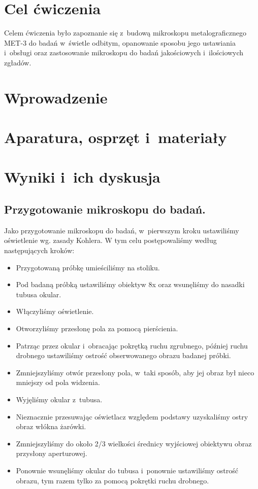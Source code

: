 

\newcommand{\labdate}{28 listopada 2020}
\newcommand{\temat}{Mikroskop MET-3}


    



\section{Cel ćwiczenia}

Celem ćwiczenia było zapoznanie się z~budową mikroskopu metalograficznego MET-3 do badań w~świetle odbitym, opanowanie sposobu jego ustawiania i~obsługi oraz zastosowanie mikroskopu do badań jakościowych i~ilościowych zgładów.

\section{Wprowadzenie}



\section{Aparatura, osprzęt i~materiały}



\section{Wyniki i~ich dyskusja}

\subsection{Przygotowanie mikroskopu do badań.}

Jako przygotowanie mikroskopu do badań, w~pierwszym kroku ustawiliśmy oświetlenie wg. zasady Kohlera.
W tym celu postępowaliśmy według następujących kroków:
\begin{itemize}
    \item Przygotowaną próbkę umieściliśmy na stoliku.
    \item Pod badaną próbką ustawiliśmy obiektyw 8x oraz wsunęliśmy do nasadki tubusa okular.
    \item Włączyliśmy oświetlenie.
    \item Otworzyliśmy przesłonę pola za pomocą pierścienia.
    \item Patrząc przez okular i~obracając pokrętką ruchu zgrubnego, później ruchu drobnego ustawiliśmy ostrość obserwowanego obrazu badanej próbki.
    \item Zmniejszyliśmy otwór przesłony pola, w~taki sposób, aby jej obraz był nieco mniejszy od pola widzenia.
    \item Wyjęliśmy okular z~tubusa.
    \item Nieznacznie przesuwając oświetlacz względem podstawy uzyskaliśmy ostry obraz włókna żarówki.
    \item Zmniejszyliśmy do około 2/3 wielkości średnicy wyjściowej obiektywu obraz przysłony aperturowej.
    \item Ponownie wsunęliśmy okular do tubusa i~ponownie ustawiliśmy ostrość obrazu, tym razem tylko za pomocą pokrętki ruchu drobnego.
\end{itemize}

